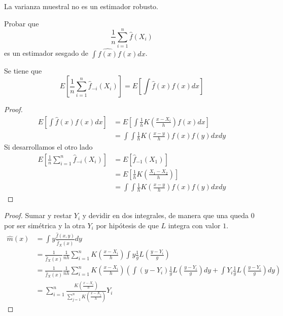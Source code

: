 \documentclass[MyPE.tex]{subfiles}
\begin{document}
\begin{nota}
La varianza muestral no es un estimador robusto.
\end{nota}
\begin{example}
Probar que 
$$
\frac{1}{n}\sum_{i=1}^n \hat{f}(X_i)
$$
es un estimador sesgado de $\int \hat{f(x)}f(x)dx$.
\end{example}
\begin{prop}
Se tiene que
$$
E\left[\frac{1}{n}\sum_{i=1}^n \hat{f}_{-i}(X_i)\right] = E\left[\int \hat{f}(x)f(x)dx \right]
$$

\end{prop}
\begin{proof}
\begin{align*}
E\left[\int \hat{f}(x)f(x)dx \right] &= E\left[\int \frac{1}{h}K\left(\frac{x-X_i}{h}\right)f(x)dx \right]\\
&=\int \int   \frac{1}{h}K\left(\frac{x-y}{h}\right)f(x)f(y)dxdy
\end{align*}
Si desarrollamos el otro lado
\begin{align*}
E\left[\frac{1}{n}\sum_{i=1}^n \hat{f}_{-i}(X_i)\right] &= E\left[\hat{f}_{-1}(X_1)\right]\\
&= E\left[\frac{1}{h}K\left(\frac{X_1-X_2}{h}\right)\right]\\
&=\int \int   \frac{1}{h}K\left(\frac{x-y}{h}\right)f(x)f(y)dxdy
\end{align*}
\end{proof}

\begin{prop}
\end{prop}
\begin{proof}
Sumar y restar $Y_i$ y devidir en dos integrales, de manera que una queda $0$ por ser simétrica y la otra $Y_i$ por hipótesis de que $L$ integra con valor $1$.
\begin{align*}
\hat{m}(x) &= \int y \frac{\hat{f}(x,y)}{\hat{f}_X(x)}dy\\
&=\frac{1}{\hat{f}_X(x)}\frac{1}{nh}\sum_{i=1}^n K\left(\frac{x-X_i}{h}\right)\int y\frac{1}{g}L\left(\frac{y-Y_i}{g}\right)\\
&=\frac{1}{\hat{f}_X(x)}\frac{1}{nh}\sum_{i=1}^n K\left(\frac{x-X_i}{h}\right)\left(\int (y-Y_i)\frac{1}{g}L\left(\frac{y-Y_i}{g}\right)dy + \int Y_i\frac{1}{g}L\left(\frac{y-Y_i}{g}\right)dy \right)\\
&=\sum_{i=1}^n \frac{K\left(\frac{x-X_i}{h}\right)}{\sum_{j=1}^n K\left(\frac{x-X_j}{h}\right)}Y_i
\end{align*}
\end{proof}
\end{document}
